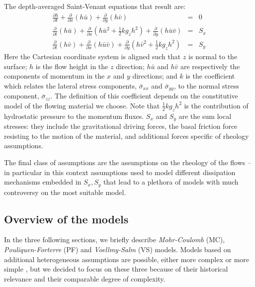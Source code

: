 \documentclass{article}
\begin{document}
The depth-averaged Saint-Venant equations that result are:
\begin{eqnarray}
\label{eq:D_A}
\frac{\partial h}{\partial t} +
\frac{\partial}{\partial x}(h \bar{u}) +
\frac{\partial}{\partial y}(h\bar{v}) &=& 0 \nonumber \\
\frac{\partial}{\partial t} (h\bar{u}) +
\frac{\partial}{\partial x}\left(h\bar{u}^2 + \frac{1}{2}k g_{z}h^2\right) + \frac{\partial}{\partial y}(h\bar{u}\bar{v}) &=& S_{x}\\
\frac{\partial}{\partial t} (h\bar{v}) +
\frac{\partial}{\partial x}(h\bar{u}\bar{v}) +
\frac{\partial}{\partial y}\left(h\bar{v}^2 + \frac{1}{2}k g_{z}h^2\right) &=& S_{y} \nonumber
\end{eqnarray}
Here the Cartesian coordinate system is aligned such that $z$ is normal to the surface; $h$ is the flow height in the $z$ direction; $h\bar{u}$ and $h\bar{v}$ are respectively the components of momentum in the $x$ and $y$ directions; and $k$ is the coefficient which relates the lateral stress components, $\bar{\sigma}_{xx}$ and $\bar{\sigma}_{yy}$, to the normal stress component, $\bar{\sigma}_{zz}$. The definition of this coefficient depends on the constitutive model of the flowing material we choose. Note that $\frac{1}{2} k g_z h^2$ is the contribution of hydrostatic pressure to the momentum fluxes. $S_x$ and $S_y$ are the sum local stresses: they include the gravitational driving forces, the basal friction force resisting to the motion of the material, and additional forces specific of rheology assumptions.

The final class of assumptions are the assumptions on the rheology of the flows -- in particular in this context assumptions used to model different dissipation mechanisms embedded in $S_x, S_y$ that lead to a plethora of models with much controversy on the most suitable model.

\subsection{Overview of the models}\label{subsec:Models}
In the three following sections, we briefly describe \emph{Mohr-Coulomb} (MC), \emph{Pouliquen-Forterre} (PF) and \emph{Voellmy-Salm} (VS) models. Models based on additional heterogeneous assumptions are possible, either more complex \citep{PitmanLe2005,Iverson2014} or more simple \citep{DadeHuppert1998}, but we decided to focus on these three because of their historical relevance and their comparable degree of complexity.
\end{document}
